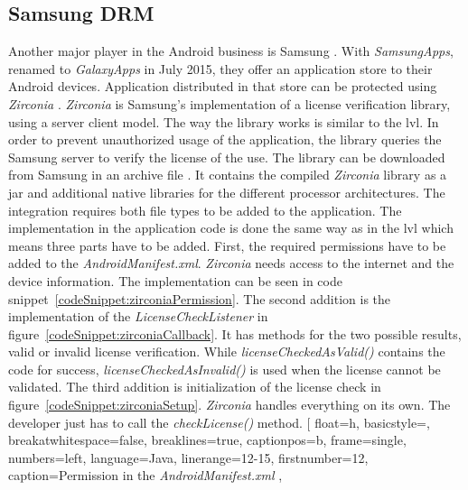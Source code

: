\subsection{Samsung DRM} \label{section:license-samsung}
Another major player in the Android business is Samsung \cite{comscoreMarket}.
With \textit{SamsungApps}, renamed to \textit{GalaxyApps} in July 2015, they offer an application store to their Android devices.
Application distributed in that store can be protected using \textit{Zirconia} \cite{samsungZirconia}.
\textit{Zirconia} is Samsung’s implementation of a license verification library, using a server client model.
\newline
The way the library works is similar to the \gls{lvl}.
In order to prevent unauthorized usage of the application, the library queries the Samsung server to verify the license of the use.
The library can be downloaded from Samsung in an archive file \cite{samsungZirconia}.
It contains the compiled \textit{Zirconia} library as a \gls{jar} and additional native libraries for the different processor architectures.
The integration requires both file types to be added to the application.
The implementation in the application code is done the same way as in the \gls{lvl} which means three parts have to be added.
\newline
First, the required permissions have to be added to the \textit{AndroidManifest.xml}.
\textit{Zirconia} needs access to the internet and the device information.
The implementation can be seen in code snippet~\ref{codeSnippet:zirconiaPermission}.
\newline
The second addition is the implementation of the \textit{LicenseCheckListener} in figure~\ref{codeSnippet:zirconiaCallback}.
It has methods for the two possible results, valid or invalid license verification.
While \textit{licenseCheckedAsValid()} contains the code for success, \textit{licenseCheckedAsInvalid()} is used when the license cannot be validated.
\newline
The third addition is initialization of the license check in figure~\ref{codeSnippet:zirconiaSetup}.
\textit{Zirconia} handles everything on its own.
The developer just has to call the \textit{checkLicense()} method.
\newline
[
  float=h,
  basicstyle=\footnotesize,
  breakatwhitespace=false,
  breaklines=true,
  captionpos=b,
  frame=single,
  numbers=left,
  language=Java,
  linerange={12-15},
  firstnumber=12,
  caption={Permission in the \textit{AndroidManifest.xml} \cite{samsungZirconia}},
